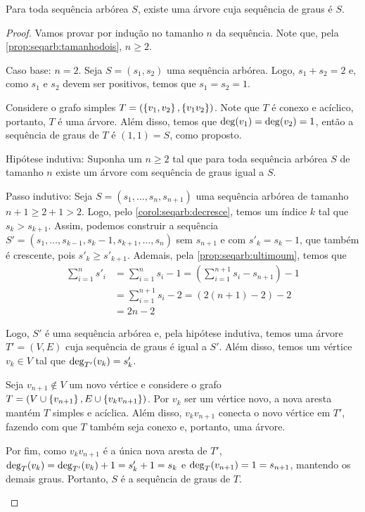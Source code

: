 \begin{lemma} \label{lemma:seqarb:existearvore}
    Para toda sequência arbórea $S$, existe uma árvore cuja sequência de graus é $S$.
\end{lemma}

\enlargethispage{1em}
\begin{proof}
    Vamos provar por indução no tamanho $n$ da sequência. Note que, pela \cref{prop:seqarb:tamanhodois}, $n \geq 2$.

    \begin{ncasos}
        \item[Caso base:] $n = 2$. Seja $S = (s_1, s_2)$ uma sequência arbórea. Logo, $s_1 + s_2 = 2$ e, como $s_1$ e $s_2$ devem ser positivos, temos que $s_1 = s_2 = 1$.

        Considere o grafo simples $T = (\set{v_1, v_2}, \set{v_1 v_2})$. Note que $T$ é conexo e acíclico, portanto, $T$ é uma árvore. Além disso, temos que $\operatorname{deg}(v_1) = \operatorname{deg}(v_2) = 1$, então a sequência de graus de $T$ é $(1, 1) = S$, como proposto.

        \item[Hipótese indutiva:] Suponha um $n \geq 2$ tal que para toda  sequência arbórea $S$ de tamanho $n$ existe um árvore com sequência de graus igual a $S$.

        \item[Passo indutivo:] Seja $S = (s_1, \ldots, s_n, s_{n+1})$ uma sequência arbórea de tamanho $n + 1 \geq 2 + 1 > 2$. Logo, pelo \cref{corol:seqarb:decresce}, temos um índice $k$ tal que $s_k > s_{k + 1}$. Assim, podemos construir a sequência $S' = (s_1, \ldots, s_{k - 1}, s_k - 1, s_{k + 1}, \ldots, s_n)$ sem $s_{n + 1}$ e com $s'_k = s_k - 1$, que também é crescente, pois $s'_k \geq s'_{k + 1}$. Ademais, pela \cref{prop:seqarb:ultimoum}, temos que
        \begin{align*}
            \sum_{i = 1}^n s'_i &= \sum_{i = 1}^n s_i - 1 = \left(\sum_{i = 1}^{n + 1} s_i - s_{n + 1}\right) - 1 \\
                &= \sum_{i = 1}^{n + 1} s_i - 2 = \left(2 (n + 1) - 2\right) - 2 \\
                &= 2n - 2
        \end{align*}

        Logo, $S'$ é uma sequência arbórea e, pela hipótese indutiva, temos uma árvore $T' = (V, E)$ cuja sequência de graus é igual a $S'$. Além disso, temos um vértice $v_k \in V$ tal que $\operatorname{deg}_{T'}(v_k) = s'_k$.

        Seja $v_{n + 1} \not\in V$ um novo vértice e considere o grafo $T = (V \cup \set{v_{n + 1}}, E \cup \set{v_k v_{n + 1}})$. Por $v_k$ ser um vértice novo, a nova aresta mantém $T$ simples e acíclica. Além disso, $v_k v_{n + 1}$ conecta o novo vértice em $T'$, fazendo com que $T$ também seja conexo e, portanto, uma árvore.

        Por fim, como $v_k v_{n + 1}$ é a única nova aresta de $T'$,  $\operatorname{deg}_T(v_k) = \operatorname{deg}_{T'}(v_k) + 1 = s'_k + 1 = s_k$ e $\operatorname{deg}_T(v_{n + 1}) = 1 = s_{n + 1}$, mantendo os demais graus. Portanto, $S$ é a sequência de graus de $T$. \qedhere
    \end{ncasos}
\end{proof}
